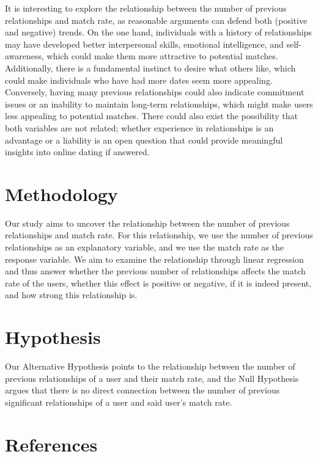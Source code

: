 \documentclass{article}
\begin{document}
It is interesting to explore the relationship between the number of previous relationships and match rate, as reasonable arguments can defend both (positive and negative) trends. On the one hand, individuals with a history of relationships may have developed better interpersonal skills, emotional intelligence, and self-awareness, which could make them more attractive to potential matches. Additionally, there is a fundamental instinct to desire what others like, which could make individuals who have had more dates seem more appealing. Conversely, having many previous relationships could also indicate commitment issues or an inability to maintain long-term relationships, which might make users less appealing to potential matches. There could also exist the possibility that both variables are not related; whether experience in relationships is an advantage or a liability is an open question that could provide meaningful insights into online dating if answered.



\section{Methodology}

Our study aims to uncover the relationship between the number of previous relationships and match rate. For this relationship, we use the number of previous relationships as an explanatory variable, and we use the match rate as the response variable. We aim to examine the relationship through linear regression and thus answer whether the previous number of relationships affects the match rate of the users, whether this effect is positive or negative, if it is indeed present, and how strong this relationship is. 

\section{Hypothesis}

Our Alternative Hypothesis points to the relationship between the number of previous relationships of a user and their match rate, and the Null Hypothesis argues that there is no direct connection between the number of previous significant relationships of a user and said user's match rate.

\section{References}


\end{document}
